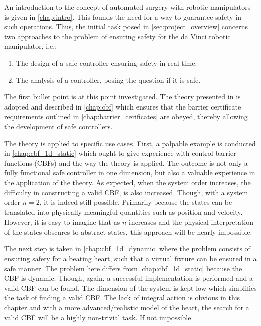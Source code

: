 An introduction to the concept of automated surgery with robotic manipulators is given in \autoref{chap:intro}. This founds the need for a way to guarantee safety in such operations. Thus, the initial task posed in \autoref{sec:project_overview} concerns two approaches to the problem of ensuring safety for the da Vinci robotic manipulator, i.e.:
\begin{enumerate}
\item The design of a safe controller ensuring safety in real-time. 
\item The analysis of a controller, posing the question if it is safe. 
\end{enumerate}
The first bullet point is at this point investigated. The theory presented in \citep{bib:org_control} is adopted and described in \autoref{chap:cbf} which ensures that the barrier certificate requirements outlined in \autoref{chap:barrier_cerificates} are obeyed, thereby allowing the development of safe controllers.

The theory is applied to specific use cases. First, a palpable example is conducted in \autoref{chap:cbf_1d_static} which ought to give experience with control barrier functions (CBFs) and the way the theory is applied. The outcome is not only a fully functional safe controller in one dimension, but also a valuable experience in the application of the theory. As expected, when the system order increases, the difficulty in constructing a valid CBF, is also increased. Though, with a system order $n=2$, it is indeed still possible. Primarily because the states can be translated into physically meaningful quantities such as position and velocity. However, it is easy to imagine that as $n$ increases and the physical interpretation of the states obscures to abstract states, this approach will be nearly impossible.

The next step is taken in \autoref{chap:cbf_1d_dynamic} where the problem consists of ensuring safety for a beating heart, such that a virtual fixture can be ensured in a safe manner. The problem here differs from \autoref{chap:cbf_1d_static} because the CBF is dynamic. Though, again, a successful implementation is performed and a valid CBF can be found. The dimension of the system is kept low which simplifies the task of finding a valid CBF. The lack of integral action is obvious in this chapter and with a more advanced/realistic model of the heart, the search for a valid CBF will be a highly non-trivial task. If not impossible.

